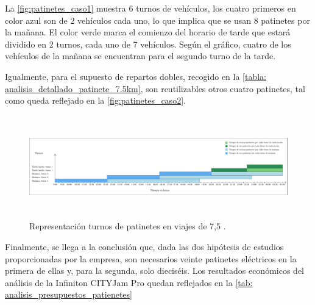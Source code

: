 La \autoref{fig:patinetes_caso1} muestra 6 turnos de vehículos, los cuatro primeros en color azul son de 2 vehículos cada uno, lo que implica que se usan 8 patinetes por la mañana. El color verde marca el comienzo del horario de tarde que estará dividido en 2 turnos, cada uno de 7 vehículos. Según el gráfico, cuatro de los vehículos de la mañana se encuentran para el segundo turno de la tarde.

Igualmente, para el supuesto de repartos dobles, recogido en la \autoref{tabla: analisis_detallado_patinete_7.5km}, son reutilizables otros cuatro patinetes, tal como queda reflejado en la
\autoref{fig:patinetes_caso2}.

\begin{figure}[ht]
    \centering
    \includegraphics[width= \textwidth, height=12em]{archivos/caso2_patinetes.pdf}
    \caption{Representación turnos de patinetes en viajes de 7,5 .}
    \label{fig:patinetes_caso2}
\end{figure}

Finalmente, se llega a la conclusión que, dada las dos hipótesis de estudios proporcionadas por la empresa, son necesarios veinte patinetes eléctricos en la primera de ellas y, para la segunda, solo dieciséis. Los resultados económicos del análisis de la Infiniton CITYJam Pro quedan reflejados en la \autoref{tab: analisis_presupuestos_patienetes}









